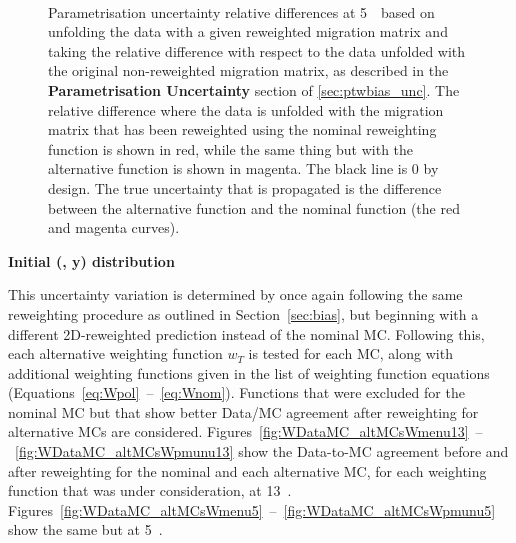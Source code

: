 \begin{figure}[h]
  \centering
   \\
  \caption{Parametrisation uncertainty relative differences at 5~\TeV~based on unfolding the data with a given reweighted migration matrix and taking the relative difference with respect to the data unfolded with the original non-reweighted migration matrix, as described in the \textbf{Parametrisation Uncertainty} section of \ref{sec:ptwbias_unc}. The relative difference where the data is unfolded with the migration matrix that has been reweighted using the nominal reweighting function is shown in red, while the same thing but with the alternative function is shown in magenta. The black line is 0 by design. The true uncertainty that is propagated is the difference between the alternative function and the nominal function (the red and magenta curves).}
  \label{fig:Wbias_unc_param5}
\end{figure}


\textbf{Initial (\ptw, y) distribution}

This uncertainty variation is determined by once again following the same reweighting procedure as outlined in Section~\ref{sec:bias}, but beginning with a different 2D-reweighted prediction instead of the nominal MC.
Following this, each alternative weighting function $w_{T}$ is tested for each MC, along with additional weighting functions given in the list of weighting function equations (Equations~\ref{eq:Wpol}~--~\ref{eq:Wnom}).
Functions that were excluded for the nominal MC but that show better Data/MC agreement after reweighting for alternative MCs are considered.
Figures~\ref{fig:WDataMC_altMCsWmenu13}~--~\ref{fig:WDataMC_altMCsWpmunu13} show the Data-to-MC agreement before and after reweighting for the nominal and each alternative MC, for each weighting function that was under consideration, at 13~\TeV.
Figures~\ref{fig:WDataMC_altMCsWmenu5}~--~\ref{fig:WDataMC_altMCsWpmunu5} show the same but at 5~\TeV.

